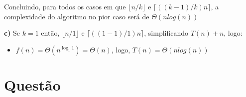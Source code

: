 \documentclass[a4paper,12pt]{article}
\begin{document}
\begin{description}
	Concluindo, para todos os casos em que $\lfloor n/k \rfloor$ e $\lceil ((k-1)/k)n \rceil$, a complexidade do algoritmo no pior caso será de $\Theta (n log(n))$ 

	\item{\textbf{c)}} Se $k=1$ então, $\lfloor n/1 \rfloor$ e $\lceil ((1-1)/1)n \rceil$, simplificando $T(n)+n$, logo:
	\begin{itemize}
		\item $f(n) = \Theta(n^{\log_1 1}) = \Theta(n)$, logo, $T(n) = \Theta(nlog(n))$
	\end{itemize}
\end{description}

\section{Questão}
\end{document}
